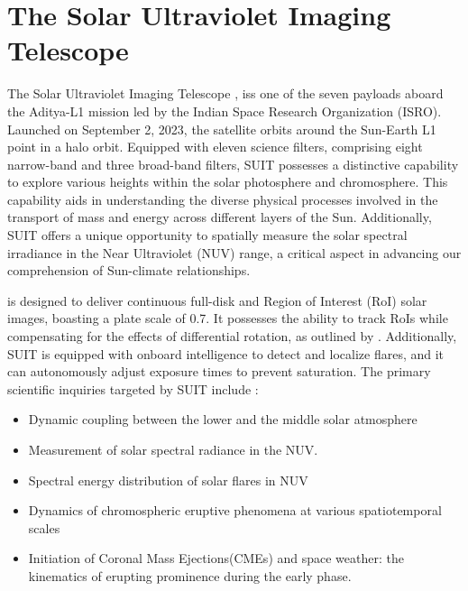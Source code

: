 \section{The Solar Ultraviolet Imaging Telescope}\label{sec:suit}

The Solar Ultraviolet Imaging Telescope \citep[SUIT;][]{ghosh16,article}, iss one of the seven payloads aboard the Aditya-L1 mission \citep{adityal1, aditya} led by the Indian Space Research Organization (ISRO). Launched on September 2, 2023, the satellite orbits around the Sun-Earth L1 point in a halo orbit. Equipped with eleven science filters, comprising eight narrow-band and three broad-band filters, SUIT possesses a distinctive capability to explore various heights within the solar photosphere and chromosphere. This capability aids in understanding the diverse physical processes involved in the transport of mass and energy across different layers of the Sun. Additionally, SUIT offers a unique opportunity to spatially measure the solar spectral irradiance in the Near Ultraviolet (NUV) range, a critical aspect in advancing our comprehension of Sun-climate relationships.

{\suit} is designed to deliver continuous full-disk and Region of Interest (RoI) solar images, boasting a plate scale of 0.7{\arcsec}. It possesses the ability to track RoIs while compensating for the effects of differential rotation, as outlined by \cite{suit_algo}. Additionally, SUIT is equipped with onboard intelligence to detect and localize flares, and it can autonomously adjust exposure times to prevent saturation. The primary scientific inquiries targeted by SUIT include \citep{suit_science, suit_main}:

\begin{itemize}
    \item Dynamic coupling between the lower and the middle solar atmosphere
    \item Measurement of solar spectral radiance in the NUV.
    \item Spectral energy distribution of solar flares in NUV
    \item Dynamics of chromospheric eruptive phenomena at various spatiotemporal scales
    \item Initiation of Coronal Mass Ejections(CMEs) and space weather: the kinematics of erupting prominence during the early phase.
\end{itemize}

